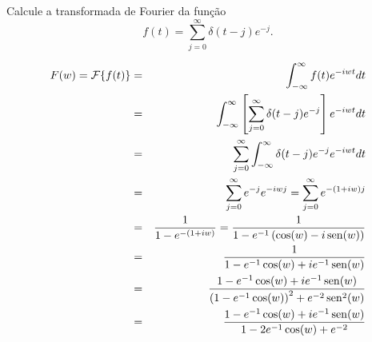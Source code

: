 \begin{Exercise} Calcule a transformada de Fourier da função
$$f(t)=\sum_{j=0}^\infty \delta(t-j) e^{-j}.$$
\end{Exercise}
\begin{Answer} 
\begin{eqnarray*}
F(w)=\mathcal{F}\{f(t)\}&=&\int_{-\infty}^\infty f(t) e^{-i w t}dt\\
&=&\int_{-\infty}^\infty \left[\sum_{j=0}^\infty\delta(t-j)e^{-j}\right] e^{-i w t}dt\\
&=&\sum_{j=0}^\infty\int_{-\infty}^\infty \delta(t-j)e^{-j} e^{-i w t}dt\\
&=&\sum_{j=0}^\infty e^{-j} e^{-i w j}
=\sum_{j=0}^\infty e^{-(1+i w) j}\\
&=&\frac{1}{1-e^{-(1+i w)}}=\frac{1}{1-e^{-1}\left(\cos(w)-i\operatorname{sen}(w)\right)}\\
&=&\frac{1}{1-e^{-1}\cos(w)+ie^{-1}\operatorname{sen}(w)}\\
&=&\frac{1-e^{-1}\cos(w)+ie^{-1}\operatorname{sen}(w)}{\left(1-e^{-1}\cos(w)\right)^2+e^{-2}\operatorname{sen}^2(w)}\\
&=&\frac{1-e^{-1}\cos(w)+ie^{-1}\operatorname{sen}(w)}{1-2e^{-1}\cos(w)+e^{-2}}\\
\end{eqnarray*}
\end{Answer}
